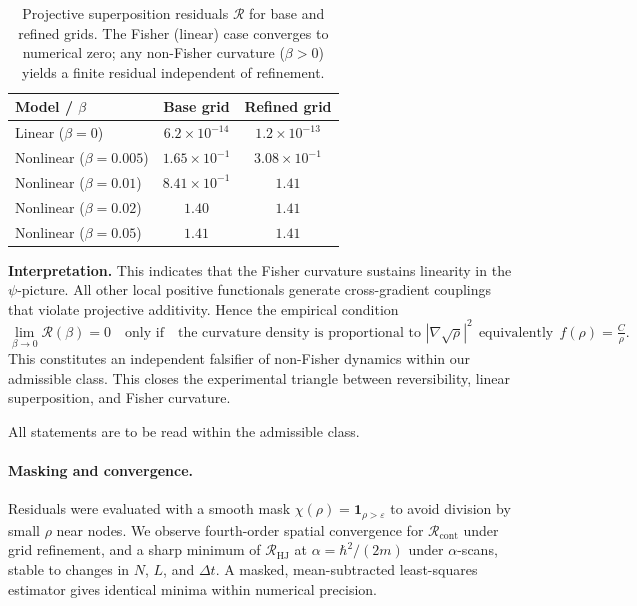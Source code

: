 \documentclass[11pt,a4paper]{article}
\numberwithin{equation}{section}
\theoremstyle{thmcompact}
\theoremstyle{remark}
\begin{document}
\begin{table}[!ht]
	\centering
	\caption{Projective superposition residuals $\mathcal{R}$ for base and refined grids.
		The Fisher (linear) case converges to numerical zero; any non-Fisher curvature
		($\beta>0$) yields a finite residual independent of refinement.}
	\begin{tabular}{@{}lcc@{}}
		\toprule
		\textbf{Model / $\beta$} & \textbf{Base grid} & \textbf{Refined grid} \\
		\midrule
		Linear ($\beta=0$) & $6.2\times10^{-14}$ & $1.2\times10^{-13}$ \\
		Nonlinear ($\beta=0.005$) & $1.65\times10^{-1}$ & $3.08\times10^{-1}$ \\
		Nonlinear ($\beta=0.01$) & $8.41\times10^{-1}$ & $1.41$ \\
		Nonlinear ($\beta=0.02$) & $1.40$ & $1.41$ \\
		Nonlinear ($\beta=0.05$) & $1.41$ & $1.41$ \\
		\bottomrule
	\end{tabular}
\end{table}

\smallskip
\textbf{Interpretation.}
This indicates that the Fisher curvature sustains linearity in the $\psi$-picture.
All other local positive functionals generate
cross-gradient couplings that
violate projective additivity.
Hence the empirical condition
\[
\lim_{\beta\to0}\mathcal{R}(\beta)=0
\quad\text{only if}\quad
\text{the curvature density is proportional to }|\nabla\sqrt\rho|^{2}
\ \ \text{equivalently}\ \ f(\rho)=\tfrac{C}{\rho}.
\]
This constitutes an independent falsifier of non-Fisher dynamics within our admissible class.
This closes the experimental triangle between reversibility, linear superposition, and Fisher curvature.

All statements are to be read within the admissible class.

\paragraph{Masking and convergence.}
Residuals were evaluated with a smooth mask $\chi(\rho)=\mathbf{1}_{\rho>\varepsilon}$ to avoid division by small $\rho$ near nodes. We observe fourth-order spatial convergence for $\mathcal{R}_{\mathrm{cont}}$ under grid refinement, and a sharp minimum of $\mathcal{R}_{\mathrm{HJ}}$ at $\alpha=\hbar^2/(2m)$ under $\alpha$-scans, stable to changes in $N$, $L$, and $\Delta t$. A masked, mean-subtracted least-squares estimator gives identical minima within numerical precision.
\end{document}
